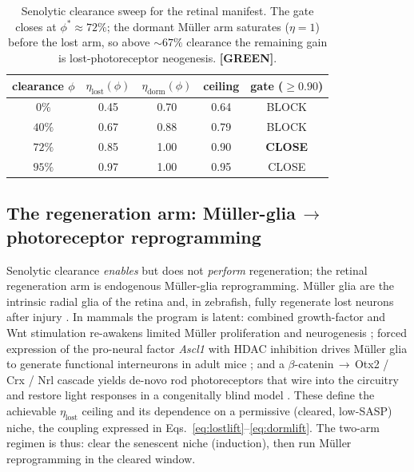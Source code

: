 \documentclass[11pt,a4paper]{article}
\newcommand{\tierbadge}[2]{\textcolor{#1}{\textbf{[#2]}}}
\providecommand{\tierGreen}{\tierbadge{green!45!black}{GREEN}}
\begin{document}
\begin{table}[h]\centering\small
\begin{tabular}{ccccc}
\toprule
\textbf{clearance $\phi$} & $\eta_{\text{lost}}(\phi)$ & $\eta_{\text{dorm}}(\phi)$ & \textbf{ceiling} & \textbf{gate ($\geq 0.90$)} \\
\midrule
$0\%$  & 0.45 & 0.70 & 0.64 & BLOCK \\
$40\%$ & 0.67 & 0.88 & 0.79 & BLOCK \\
$72\%$ & 0.85 & 1.00 & 0.90 & \textbf{CLOSE} \\
$95\%$ & 0.97 & 1.00 & 0.95 & CLOSE \\
\bottomrule
\end{tabular}
\caption{Senolytic clearance sweep for the retinal manifest. The gate closes at
$\phi^\ast\!\approx\!72\%$; the dormant M\"uller arm saturates ($\eta=1$) before the lost arm,
so above ${\sim}67\%$ clearance the remaining gain is lost-photoreceptor neogenesis. \tierGreen.}
\label{tab:sweep}
\end{table}

\subsection{The regeneration arm: M\"uller-glia\,$\to$\,photoreceptor reprogramming}
\label{sec:muller}
Senolytic clearance \emph{enables} but does not \emph{perform} regeneration; the retinal
regeneration arm is endogenous M\"uller-glia reprogramming. M\"uller glia are the intrinsic
radial glia of the retina and, in zebrafish, fully regenerate lost neurons after injury
\citep{goldman2014}. In mammals the program is latent: combined growth-factor and Wnt stimulation
re-awakens limited M\"uller proliferation and neurogenesis \citep{karl2008}; forced expression of
the pro-neural factor \emph{Ascl1} with HDAC inhibition drives M\"uller glia to generate
functional interneurons in adult mice \citep{jorstad2017}; and a $\beta$-catenin\,$\to$\,Otx2 /
Crx / Nrl cascade yields de-novo rod photoreceptors that wire into the circuitry and restore
light responses in a congenitally blind model \citep{yao2018}. These define the achievable
$\eta_{\text{lost}}$ ceiling and its dependence on a permissive (cleared, low-SASP) niche, the
coupling expressed in Eqs.~\eqref{eq:lostlift}--\eqref{eq:dormlift}. The two-arm regimen is thus:
clear the senescent niche (induction), then run M\"uller reprogramming in the cleared window.
\end{document}
